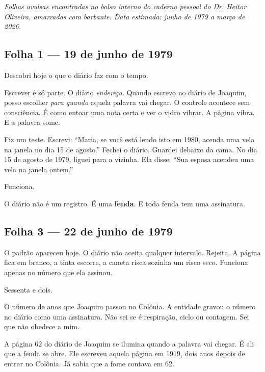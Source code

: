 
\noindent \textit{Folhas avulsas encontradas no bolso interno do caderno pessoal do Dr. Heitor Oliveira, amarradas com barbante. Data estimada: junho de 1979 a março de 2026.}

\subsection*{Folha 1 --- 19 de junho de 1979}

\noindent Descobri hoje o que o diário faz com o tempo.

\noindent Escrever é só parte. O diário \textit{endereça}. Quando escrevo no diário de Joaquim, posso escolher \textit{para quando} aquela palavra vai chegar. O controle acontece sem consciência. É como entoar uma nota certa e ver o vidro vibrar. A página vibra. E a palavra some.

\noindent Fiz um teste. Escrevi: ``Maria, se você está lendo isto em 1980, acenda uma vela na janela no dia 15 de agosto.'' Fechei o diário. Guardei debaixo da cama. No dia 15 de agosto de 1979, liguei para a vizinha. Ela disse: ``Sua esposa acendeu uma vela na janela ontem.''

\noindent Funciona.

\noindent O diário não é um registro. É uma \textbf{fenda}. E toda fenda tem uma assinatura.

\subsection*{Folha 3 --- 22 de junho de 1979}

\noindent O padrão apareceu hoje. O diário não aceita qualquer intervalo. Rejeita. A página fica em branco, a tinta escorre, a caneta risca sozinha um risco seco. Funciona apenas no número que ela assinou.

\noindent Sessenta e dois.

\noindent O número de anos que Joaquim passou no Colônia. A entidade gravou o número no diário como uma assinatura. Não sei se é respiração, ciclo ou contagem. Sei que não obedece a mim.

\noindent A página 62 do diário de Joaquim se ilumina quando a palavra vai chegar. É ali que a fenda se abre. Ele escreveu aquela página em 1919, dois anos depois de entrar no Colônia. Já sabia que a fome contava em 62.

